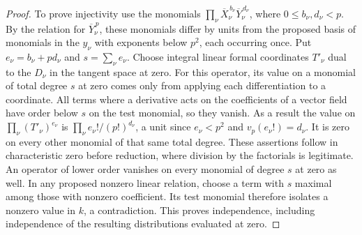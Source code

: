 \documentclass[a4paper,11pt]{article}
\theoremstyle{definition}
\theoremstyle{remark}
\numberwithin{equation}{section}
\begin{document}
\begin{proof}
To prove injectivity use the monomials
\(\prod_\nu\overline X_\nu^{\,b_\nu}\overline Y_\nu^{\,d_\nu}\),
where \(0\le b_\nu,d_\nu<p\). By the relation for
\(\overline Y_\nu^{\,p}\), these monomials differ by units from
the proposed basis of monomials in the \(y_\nu\) with exponents below
\(p^2\), each occurring once. Put \(e_\nu=b_\nu+pd_\nu\) and
\(s=\sum_\nu e_\nu\). Choose integral linear formal coordinates
\(T'_\nu\) dual to the \(D_\nu\) in the tangent space at zero.
For this operator, its value on a monomial of total degree \(s\) at
zero comes only from applying each differentiation to a coordinate.
All terms where a derivative acts on the coefficients of a vector
field have order below \(s\) on the test monomial, so they vanish.
As a result the value on \(\prod_\nu(T'_\nu)^{e_\nu}\) is
\(\prod_\nu e_\nu!/(p!)^{d_\nu}\), a unit since
\(e_\nu<p^2\) and \(v_p(e_\nu!)=d_\nu\). It is zero on every other
monomial of that same total degree. These assertions follow in
characteristic zero before reduction, where division by the factorials
is legitimate. An operator of lower order vanishes on every
monomial of degree \(s\) at zero as well. In any proposed nonzero
linear relation, choose a term with \(s\) maximal among those with
nonzero coefficient. Its test monomial therefore isolates a nonzero
value in \(k\), a contradiction. This proves independence, including
independence of the resulting distributions evaluated at zero.
\end{proof}
\end{document}
